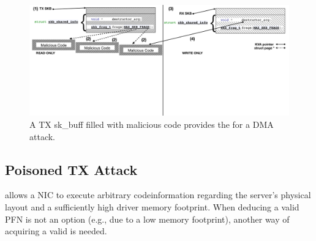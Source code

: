 \begin{figure}[t]
    \centering
    \includegraphics[width=0.8\linewidth]{figs/accomplice.pdf}
    \caption{A TX sk\_buff filled with malicious code provides the \kva for a DMA attack.}
    \label{fig:payload}
\end{figure}
\subsection{\DIFdelbegin {}\DIFdelend Poisoned TX \Compound{} Attack}\label{sec:posion}

\DIFdelbegin {}\DIFdelend \DIFaddbegin {}\DIFaddend allows a NIC to execute arbitrary code\DIFdelbegin {}\DIFdelend \DIFaddbegin {}\DIFaddend information regarding the server's physical layout and a sufficiently high driver memory footprint. When deducing a valid PFN is not an option (e.g., due to a low memory footprint), another way of acquiring a valid \kva{} is needed.

